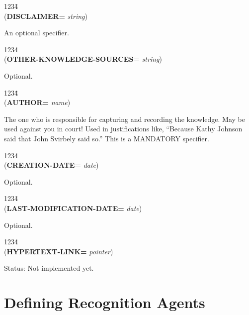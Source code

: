 \begin{tabbing}
1234\= \kill
\\
({\bf DISCLAIMER=} {\it string\/}) \\
\end{tabbing}
An optional specifier.

\begin{tabbing}
1234\= \kill
\\
({\bf OTHER-KNOWLEDGE-SOURCES=} {\it string\/}) \\
\end{tabbing}
Optional.

\begin{tabbing}
1234\= \kill
\\
({\bf AUTHOR=} {\it name\/}) \\
\end{tabbing}
The one who is responsible for capturing and recording the
knowledge.  May be used against you in court!  Used in justifications
like, ``Because Kathy Johnson said that John Svirbely said so.''  This
is a MANDATORY specifier.

\begin{tabbing}
1234\= \kill
\\
({\bf CREATION-DATE=} {\it date\/}) \\
\end{tabbing}
Optional.

\begin{tabbing}
1234\= \kill
\\
({\bf LAST-MODIFICATION-DATE=} {\it date\/}) \\
\end{tabbing}
Optional.

\begin{tabbing}
1234\= \kill
\\
({\bf HYPERTEXT-LINK=} {\it pointer\/}) \\
\end{tabbing}
Status:  Not implemented yet.




\chapter{Defining Recognition Agents}



